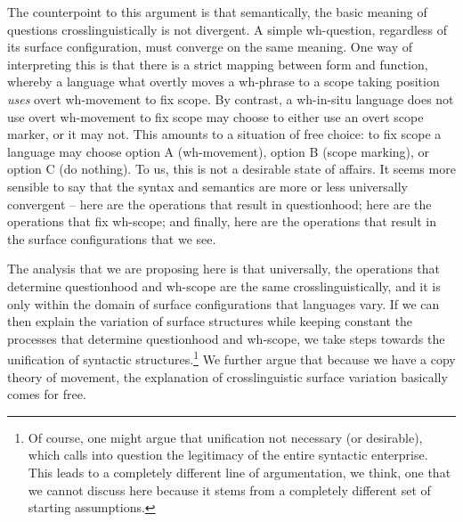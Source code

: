 \documentclass[charis]{glossa}
\begin{document}
The counterpoint to this argument is that semantically, the basic meaning of questions crosslinguistically is not divergent. A simple wh-question, regardless of its surface configuration, must converge on the same meaning. One way of interpreting this is that there is a strict mapping between form and function, whereby a language what overtly moves a wh-phrase to a scope taking position \textit{uses} overt wh-movement to fix scope. By contrast, a wh-in-situ language does not use overt wh-movement to fix scope may choose to either use an overt scope marker, or it may not. This amounts to a situation of free choice: to fix scope a language may choose option A (wh-movement), option B (scope marking), or option C (do nothing). To us, this is not a desirable state of affairs. It seems more sensible to say that the syntax and semantics are more or less universally convergent -- here are the operations that result in questionhood; here are the operations that fix wh-scope; and finally, here are the operations that result in the surface configurations that we see.

The analysis that we are proposing here is that universally, the operations that determine questionhood and wh-scope are the same crosslinguistically, and it is only within the domain of surface configurations that languages vary. If we can then explain the variation of surface structures while keeping constant the processes that determine questionhood and wh-scope, we take steps towards the unification of syntactic structures.\footnote{Of course, one might argue that unification not necessary (or desirable), which calls into question the legitimacy of the entire syntactic enterprise. This leads to a completely different line of argumentation, we think, one that we cannot discuss here because it stems from a completely different set of starting assumptions.} We further argue that because we have a copy theory of movement, the explanation of crosslinguistic surface variation basically comes for free.
\end{document}
